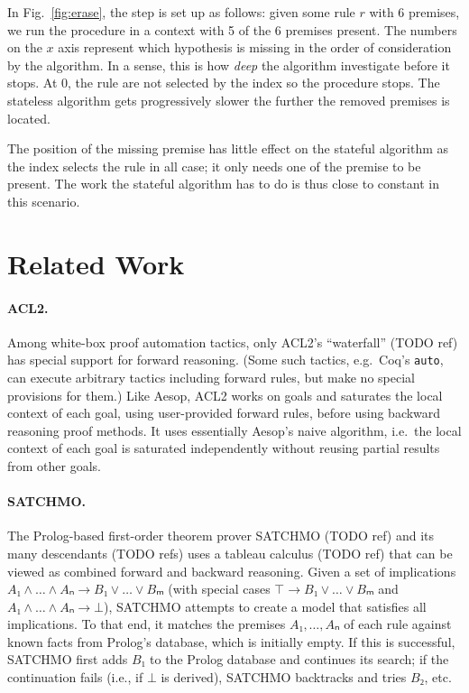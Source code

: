 \documentclass[runningheads]{llncs}
\newcommand{\xcom}[1]{{\color{cyan}{Xavier: #1}} }
\begin{document}
In Fig.~\ref{fig:erase}, the step is set up as follows: given some rule $r$ with $6$ \xcom{motivate 6} premises, we run the procedure in a context with 5 of the 6 premises present.
The numbers on the $x$ axis represent which hypothesis is missing in the order of consideration by the algorithm.
In a sense, this is how \textit{deep} the algorithm investigate before it stops.
At $0$, the rule are not selected by the index so the procedure stops.
The stateless algorithm gets progressively slower the further the removed premises is located.

The position of the missing premise has little effect on the stateful algorithm as the index selects the rule in all case; it only needs one of the premise to be present.
The work the stateful algorithm has to do is thus close to constant in this scenario.

\section{Related Work}

\paragraph{ACL2.}
Among white-box proof automation tactics, only ACL2's \enquote{waterfall} (TODO ref) has special support for forward reasoning.
(Some such tactics, e.g.\ Coq's \texttt{auto}, can execute arbitrary tactics including forward rules, but make no special provisions for them.)
Like Aesop, ACL2 works on goals and saturates the local context of each goal, using user-provided forward rules, before using backward reasoning proof methods.
It uses essentially Aesop's naive algorithm, i.e.\ the local context of each goal is saturated independently without reusing partial results from other goals.

\paragraph{SATCHMO.}
The Prolog-based first-order theorem prover SATCHMO (TODO ref) and its many descendants (TODO refs) uses a tableau calculus (TODO ref) that can be viewed as combined forward and backward reasoning.
Given a set of implications $A₁ ∧ \dots ∧ Aₙ → B₁ ∨ \dots ∨ Bₘ$ (with special cases $⊤ → B₁ ∨ \dots ∨ Bₘ$ and $A₁ ∧ \dots ∧ Aₙ → ⊥$), SATCHMO attempts to create a model that satisfies all implications.
To that end, it matches the premises $A₁, \dots, Aₙ$ of each rule against known facts from Prolog's database, which is initially empty.
If this is successful, SATCHMO first adds $B₁$ to the Prolog database and continues its search; if the continuation fails (i.e., if $⊥$ is derived), SATCHMO backtracks and tries $B₂$, etc.
\end{document}
